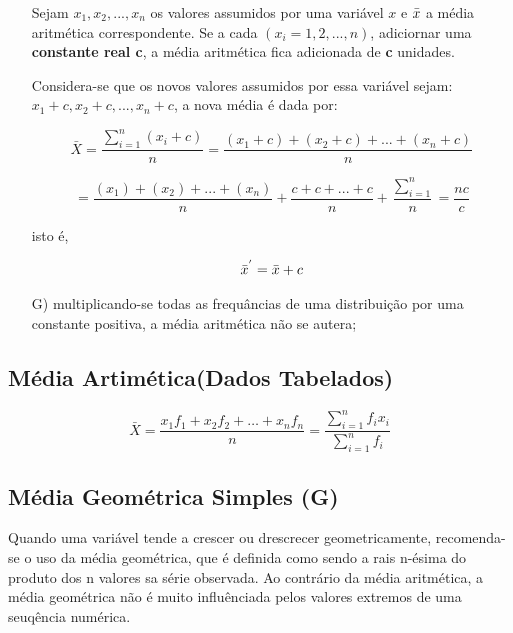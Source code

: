 \begin{enumerate}
Sejam $x_{1}, x_{2},...,x_{n}$ os valores assumidos por uma variável $x$ e $\Bar{x}$ a média aritmética correspondente. Se a cada $(x_{i}=1,2,...,n)$, adiciornar uma \textbf{constante real c}, a média aritmética fica adicionada de \textbf{c} unidades.\vskip0.3cm

Considera-se que os novos valores assumidos por essa variável sejam: $x_{1}+c,x_{2}+c,...,x_{n}+c$, a nova média é dada por:

\begin{equation}\label{media3}
     \bar{X}= \frac{\sum_{i=1}^{n}(x_{i}+c)}{n}=\frac{(x_{1}+c)+(x_{2}+c)+...+(x_{n}+c)}{n} 
\end{equation}

\begin{equation*}\label{media4}
  =\frac{(x_{1})+(x_{2})+...+(x_{n})}{n}+\frac{c+c+...+c}{n}+\frac{\sum_{i=1}^{n}}{n}=\frac{nc}{c}
\end{equation*}

isto é, 

$$\Bar{x}^{'}=\Bar{x}+c$$

\item [{G)}]multiplicando-se todas as frequâncias de uma distribuição por uma constante positiva, a média aritmética não se autera; 
\end{enumerate}

\subsection{Média Artimética(Dados Tabelados)}


\begin{equation}\label{media2}
     \bar{X}= \frac{x_{1}f_{1}+x_{2}f_{2}+\ldots+x_{n}f_{n}}{n} = \frac{\sum_{i=1}^{n}f_{i}x_{i}}{\sum_{i=1}^{n}f_{i}}
\end{equation}





\subsection{Média Geométrica Simples (G)}

Quando uma variável tende a crescer ou drescrecer geometricamente, recomenda-se o uso da média geométrica, que é definida como sendo a rais n-ésima do produto dos n valores sa série observada. Ao contrário da média aritmética, a média geométrica não é muito influênciada pelos valores extremos de uma seuqência numérica.\vskip0.3cm


